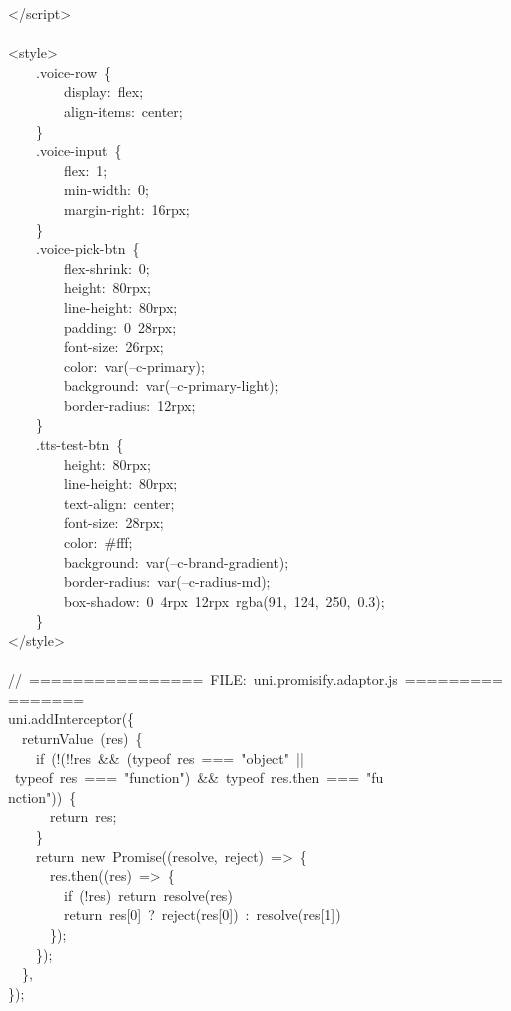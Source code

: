\documentclass[a4paper,10pt]{article}
\begin{document}
{\ttfamily\footnotesize\raggedright
</script>\\
\mbox{}\\
<style>\\
~~~~.voice-row~\{\\
~~~~~~~~display:~flex;\\
~~~~~~~~align-items:~center;\\
~~~~\}\\
~~~~.voice-input~\{\\
~~~~~~~~flex:~1;\\
~~~~~~~~min-width:~0;\\
~~~~~~~~margin-right:~16rpx;\\
~~~~\}\\
~~~~.voice-pick-btn~\{\\
~~~~~~~~flex-shrink:~0;\\
~~~~~~~~height:~80rpx;\\
~~~~~~~~line-height:~80rpx;\\
~~~~~~~~padding:~0~28rpx;\\
~~~~~~~~font-size:~26rpx;\\
~~~~~~~~color:~var(--c-primary);\\
~~~~~~~~background:~var(--c-primary-light);\\
~~~~~~~~border-radius:~12rpx;\\
~~~~\}\\
~~~~.tts-test-btn~\{\\
~~~~~~~~height:~80rpx;\\
~~~~~~~~line-height:~80rpx;\\
~~~~~~~~text-align:~center;\\
~~~~~~~~font-size:~28rpx;\\
~~~~~~~~color:~\#fff;\\
~~~~~~~~background:~var(--c-brand-gradient);\\
~~~~~~~~border-radius:~var(--c-radius-md);\\
~~~~~~~~box-shadow:~0~4rpx~12rpx~rgba(91,~124,~250,~0.3);\\
~~~~\}\\
</style>\\
\mbox{}\\
//~================~FILE:~uni.promisify.adaptor.js~================\\
uni.addInterceptor(\{\\
~~returnValue~(res)~\{\\
~~~~if~(!(!!res~\&\&~(typeof~res~===~"object"~||~typeof~res~===~"function")~\&\&~typeof~res.then~===~"fu\\
nction"))~\{\\
~~~~~~return~res;\\
~~~~\}\\
~~~~return~new~Promise((resolve,~reject)~=>~\{\\
~~~~~~res.then((res)~=>~\{\\
~~~~~~~~if~(!res)~return~resolve(res)~\\
~~~~~~~~return~res[0]~?~reject(res[0])~:~resolve(res[1])\\
~~~~~~\});\\
~~~~\});\\
~~\},\\
\});\\
\mbox{}
}
\end{document}
